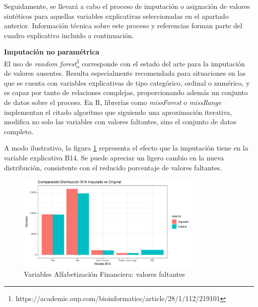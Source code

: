\documentclass[a4paper, 11pt]{article}
\begin{document}
Seguidamente, se llevará a cabo el proceso de imputación o asignación de valores
sintéticos para aquellas variables explicativas seleccionadas en el apartado anterior.
Información técnica sobre este proceso y referencias forman parte del cuadro 
explicativo incluido a continuación.
\hspace{3em}

\begin{center}
\colorbox{gray!15}{
\begin{minipage}{0.8\textwidth}
\textbf{Imputación no paramétrica}\\
  El uso de \textit{random forest}\footnote{https://academic.oup.com/bioinformatics/article/28/1/112/219101} corresponde con el estado del arte para la imputación de
  valores ausentes. Resulta especialmente recomendada para situaciones en las que se
  cuenta con variables explicativas de tipo categórico, ordinal o numérico, y es capaz
  por tanto de relaciones complejas, proporcionando además un conjunto de datos sobre
  el proceso. En R, librerías como \textit{missForest} o \textit{missRange} implementan
  el citado algoritmo que siguiendo una aproximación iterativa, modifica no solo las
  variables con valores faltantes, sino el conjunto de datos completo.
\end{minipage}}
\end{center}

A modo ilustrativo, la figura \ref{fig:Analysis_MV_B14} representa el efecto que la 
imputación tiene en la variable explicativa B14. Se puede apreciar un ligero cambio en 
la nueva distribución, consistente con el reducido porcentaje de valores faltantes.

\begin{figure}[ht]
    \centering
    \includegraphics[width=0.8\textwidth]{images/Analysis_MV_B14.pdf} 
    \caption{Variables Alfabetización Financiera: valores faltantes}
    \label{fig:Analysis_MV_B14}
\end{figure}
\end{document}
